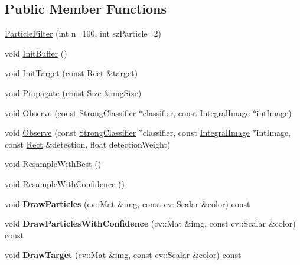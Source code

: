 \subsection*{Public Member Functions}
\begin{DoxyCompactItemize}
\item 
\hyperlink{classParticleFilter_ad05d7aeddc103fc32b6de3a751c37471}{Particle\+Filter} (int n=100, int sz\+Particle=2)
\item 
void \hyperlink{classParticleFilter_a3bf44906e7f1b546c96815856d330323}{Init\+Buffer} ()
\item 
void \hyperlink{classParticleFilter_afcde50511c90d318ec335bda8639c58f}{Init\+Target} (const \hyperlink{classRect}{Rect} \&target)
\item 
void \hyperlink{classParticleFilter_a166db9f33feabf14126df2de541a593d}{Propagate} (const \hyperlink{classSize}{Size} \&img\+Size)
\item 
void \hyperlink{classParticleFilter_a4529ea61cf9ab6ddd18f55434a4ff3b9}{Observe} (const \hyperlink{classStrongClassifier}{Strong\+Classifier} $\ast$classifier, const \hyperlink{classIntegralImage}{Integral\+Image} $\ast$int\+Image)
\item 
void \hyperlink{classParticleFilter_ad1ae015d78e510587c8928fa2ebcf9c0}{Observe} (const \hyperlink{classStrongClassifier}{Strong\+Classifier} $\ast$classifier, const \hyperlink{classIntegralImage}{Integral\+Image} $\ast$int\+Image, const \hyperlink{classRect}{Rect} \&detection, float detection\+Weight)
\item 
void \hyperlink{classParticleFilter_a76b01cd9d9d0fa181b89ffe3dcf5fbab}{Resample\+With\+Best} ()
\item 
void \hyperlink{classParticleFilter_ab191492fa8c67ecb0546e69d50fa2481}{Resample\+With\+Confidence} ()
\item 
\hypertarget{classParticleFilter_a666ab9bee3ed479c5e9387f8d5908e48}{}void {\bfseries Draw\+Particles} (cv\+::\+Mat \&img, const cv\+::\+Scalar \&color) const \label{classParticleFilter_a666ab9bee3ed479c5e9387f8d5908e48}

\item 
\hypertarget{classParticleFilter_a10b8f53b1f9245417ecab6f3dcb483e7}{}void {\bfseries Draw\+Particles\+With\+Confidence} (cv\+::\+Mat \&img, const cv\+::\+Scalar \&color) const \label{classParticleFilter_a10b8f53b1f9245417ecab6f3dcb483e7}

\item 
\hypertarget{classParticleFilter_ace5259baa39baccc26212d9ed116cf7c}{}void {\bfseries Draw\+Target} (cv\+::\+Mat \&img, const cv\+::\+Scalar \&color) const \label{classParticleFilter_ace5259baa39baccc26212d9ed116cf7c}


\end{DoxyCompactItemize}
